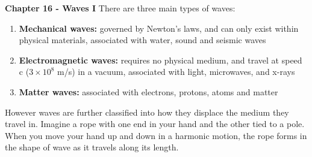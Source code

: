 \documentclass[11pt]{article}
\begin{document}
\noindent \textbf{Chapter 16 - Waves I}
\newline
\newline
    There are three main types of waves:
    \begin{enumerate}
        \item \textbf{Mechanical waves:} governed by Newton's laws, and can only exist
              within physical materials,
              \newline associated with water, sound and seismic waves

        \item \textbf{Electromagnetic waves:} requires no physical medium, and travel at speed c ($3 \times 10^8$ m/s) in a vacuum,
         associated with light, microwaves, and x-rays
        \item \textbf{Matter waves:} associated with electrons, protons, atoms and matter
    \end{enumerate}

    \noindent However waves are further classified into how they displace the medium they travel in.
    Imagine a rope with one end in your hand and the other tied to a pole.
   When you move your hand up and down in a harmonic motion,
    the rope forms in the shape of wave as it travels along its length.

\begin{figure}[!ht]
    \centering

    \label{fig:my_label}
\end{figure}
\end{document}
